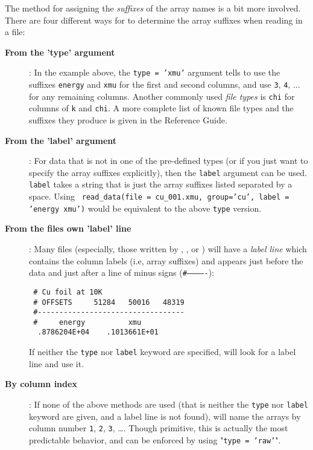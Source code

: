 \documentclass[11pt]{article}
\begin{document}
The method for assigning the {\emph{suffixes}} of the array names is a bit
more involved.  There are four different ways for {\ifeffit} to determine
the array suffixes when reading in a file:
\begin{description}
\item[{\bf{From the 'type' argument}}]: In the example above, the {\tt{type
      = 'xmu'}} argument tells {\ifeffit} to use the suffixes {\tt{energy}}
  and {\tt{xmu}} for the first and second columns, and use {\tt{3}},
  {\tt{4}}, ... for any remaining columns.  Another commonly used
  {\emph{file types}} is {\tt{chi}} for columns of {\tt{k}} and {\tt{chi}}.
  A more complete list of known file types and the suffixes they produce is
  given in the Reference Guide.

\item[{\bf{From the 'label' argument}}]: For data that is not in one of the
  pre-defined types (or if you just want to specify the array suffixes
  explicitly), then the {\tt{label}} argument can be used.  {\tt{label}}
  takes a string that is just the array suffixes listed separated by a
  space. Using {\tt{ read\_data(file = cu\_001.xmu, group='cu', label =
      'energy xmu')}} 
  would be equivalent to the above {\tt{type}} version.

  \item[{\bf{From the files own 'label' line}}]: Many files (especially,
    those written by {\ifeffit}, {\feffit}, or {\autobk}) will have a
    {\emph{label line}} which contains the column labels (i.e,
    array suffixes) and appears just before the data and just after
    a line of minus signs ({\tt{\#-------------}}):
    {\small{
 \begin{Sbox}\begin{minipage}{5.00truein}
\begin{Verbatim}
 # Cu foil at 10K
 # OFFSETS     51284   50016   48319
 #----------------------------------
 #     energy          xmu
  .8786204E+04    .1013661E+01
\end{Verbatim}
 \end{minipage}
 \end{Sbox}\setlength{\fboxsep}{2mm}{%
 \begin{flushright}\shadowbox{\TheSbox}\end{flushright}}
}}\noindent
    If neither the {\tt{type}} nor {\tt{label}} keyword are specified,
    {\ifeffit}  will look for a label line and use it.
    
  \item[{\bf{By column index}}]: If none of the above methods are used
    (that is neither the {\tt{type}} nor {\tt{label}} keyword are given,
    and a label line is not found), {\ifeffit} will name the arrays by
    column number {\tt{1}}, {\tt{2}}, {\tt{3}}, \ldots.  Though primitive,
    this is actually the most predictable behavior, and can be enforced by
    using "{\tt{type = 'raw'}}".

\end{description}
\end{document}
